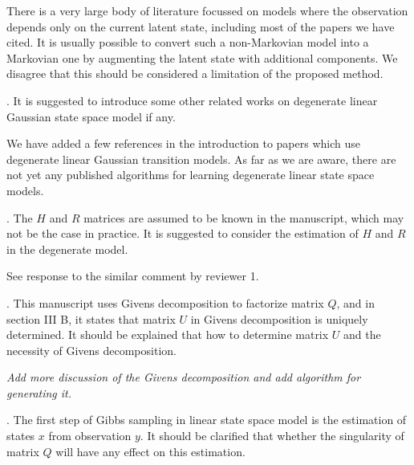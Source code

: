 \documentclass{article}
\newenvironment{review}[0]{\begin{itshape}\color{Gray}\noindent}{\end{itshape}\vspace{0.4cm}}
\newenvironment{response}[0]{\noindent}{\vspace{0.4cm}}
\newcommand{\meta}[1]{{\color{red}\em #1}}
\begin{document}
\begin{response}
 There is a very large body of literature focussed on models where the observation depends only on the current latent state, including most of the papers we have cited. It is usually possible to convert such a non-Markovian model into a Markovian one by augmenting the latent state with additional components. We disagree that this should be considered a limitation of the proposed method.
\end{response}

\begin{review}
2.  It is suggested to introduce some other related works on degenerate linear Gaussian state space model if any.
\end{review}

\begin{response}
 We have added a few references in the introduction to papers which use degenerate linear Gaussian transition models. As far as we are aware, there are not yet any published algorithms for learning degenerate linear state space models.
\end{response}

\begin{review}
3.  The $H$ and $R$ matrices are assumed to be known in the manuscript, which may not be the case in practice. It is suggested to consider the estimation of $H$ and $R$ in the degenerate model.
\end{review}

\begin{response}
 See response to the similar comment by reviewer 1.
\end{response}

\begin{review}
4.  This manuscript uses Givens decomposition to factorize matrix $Q$, and in section III B, it states that matrix $U$ in Givens decomposition is uniquely determined. It should be explained that how to determine matrix $U$ and the necessity of Givens decomposition.
\end{review}

\begin{response}
 \meta{Add more discussion of the Givens decomposition and add algorithm for generating it.}
\end{response}

\begin{review}
5.   The first step of Gibbs sampling in linear state space model is the estimation of states $x$ from observation $y$. It should be clarified that whether the singularity of matrix $Q$ will have any effect on this estimation. 
\end{review}
\end{document}
